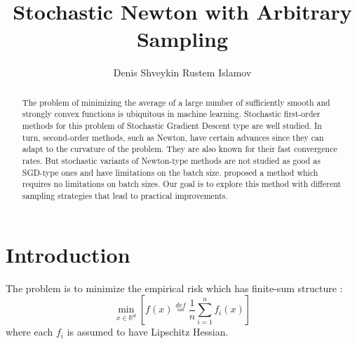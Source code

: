 \documentclass{article}
\title{Stochastic Newton with Arbitrary Sampling}
\author{Denis Shveykin
	\And
	Rustem Islamov
}
\date{}
\begin{document}
	
\maketitle

\begin{abstract}
	
	The problem of minimizing the average of a large number of sufficiently smooth and strongly convex functions is ubiquitous in machine learning. Stochastic first-order methods for this problem of Stochastic Gradient Descent type are well studied. In turn, second-order methods, such as Newton, have certain advances since they can adapt to the curvature of the problem. They are also known for their fast convergence rates. But stochastic variants of Newton-type methods are not studied as good as SGD-type ones and have limitations on the batch size. \cite{kovalev2019stochastic} proposed a method which requires no limitations on batch sizes. Our goal is to explore this method with different sampling strategies that lead to practical improvements.
	
\end{abstract}



\section{Introduction}

	The problem is to minimize the empirical risk which has finite-sum structure \cite{kovalev2019stochastic}:
	\begin{equation}
		\underset{x \in \mathbb R^d}{\min} \left[ f(x) \overset{def}{=} \frac{1}{n} \sum \limits_{i=1}^n f_i(x) \right]
	\end{equation}
	where each $f_i$ is assumed to have Lipschitz Hessian. \\
	
\end{document}
